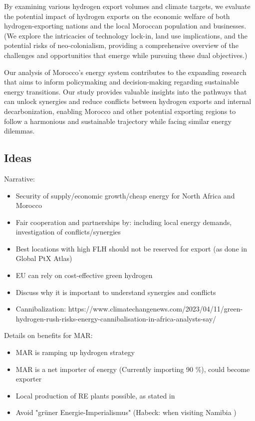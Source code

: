 By examining various hydrogen export volumes and climate targets, we evaluate the potential impact of hydrogen exports on the economic welfare of both hydrogen-exporting nations and the local Moroccan population and businesses. (We explore the intricacies of technology lock-in, land use implications, and the potential risks of neo-colonialism, providing a comprehensive overview of the challenges and opportunities that emerge while pursuing these dual objectives.)

Our analysis of Morocco's energy system contributes to the expanding research that aims to inform policymaking and decision-making regarding sustainable energy transitions. Our study provides valuable insights into the pathways that can unlock synergies and reduce conflicts between hydrogen exports and internal decarbonization, enabling Morocco and other potential exporting regions to follow a harmonious and sustainable trajectory while facing similar energy dilemmas.


\subsection{Ideas}
Narrative: 
\begin{itemize}
    \item Security of supply/economic growth/cheap energy for North Africa and Morocco
    \item Fair cooperation and partnerships by: including local energy demands, investigation of conflicts/synergies
    \item Best locations with high FLH should not be reserved for export (as done in Global PtX Atlas)
    \item EU can rely on cost-effective green hydrogen
    \item Discuss why it is important to understand synergies and conflicts
    \item Cannibalization: https://www.climatechangenews.com/2023/04/11/green-hydrogen-rush-risks-energy-cannibalisation-in-africa-analysts-say/
\end{itemize}

Details on benefits for MAR:
\begin{itemize}
    \item MAR is ramping up hydrogen strategy
    \item MAR is a net importer of energy (Currently importing 90 \%), could become exporter
    \item Local production of RE plants possible, as stated in \cite{Ersoy2022}
    \item Avoid "gr{\"u}ner Energie-Imperialismus" (Habeck: when visiting Namibia ) \cite{HabeckEnergieimperialismus}
\end{itemize}



